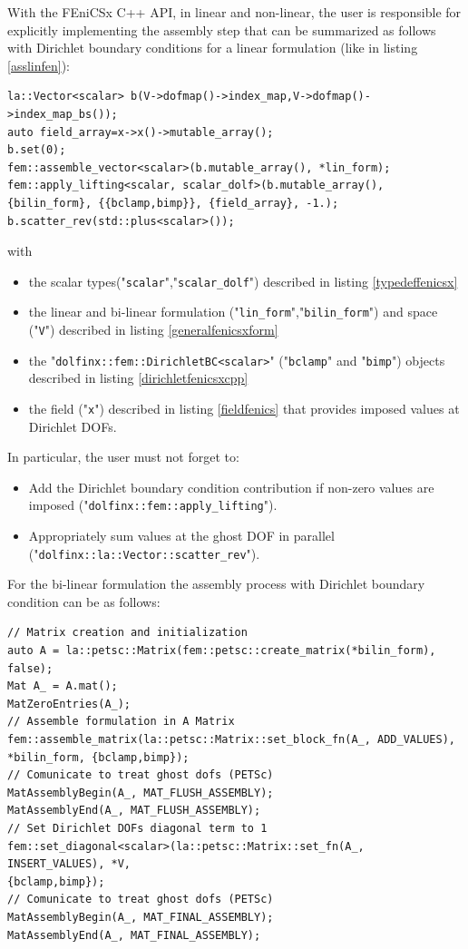 \documentclass[12pt]{article}
\newcommand{\mycode}[1]{\textsf{"}\lstinline`#1`\textsf{"}}
\begin{document}
With the FEniCSx C++ API, in linear and non-linear, the user is responsible for explicitly implementing the assembly step  that can be summarized as follows with Dirichlet boundary conditions for a linear formulation (like in listing \ref{asslinfen}): 
\begin{lstlisting}[numbers=none,basicstyle=\scriptsize,label=assfenicslinlin]
la::Vector<scalar> b(V->dofmap()->index_map,V->dofmap()->index_map_bs());
auto field_array=x->x()->mutable_array();
b.set(0);	
fem::assemble_vector<scalar>(b.mutable_array(), *lin_form);
fem::apply_lifting<scalar, scalar_dolf>(b.mutable_array(), {bilin_form}, {{bclamp,bimp}}, {field_array}, -1.);
b.scatter_rev(std::plus<scalar>()); 
\end{lstlisting}
with 
\begin{itemize}
	\item the scalar types(\mycode{scalar},\mycode{scalar_dolf})  described in listing \ref{typedeffenicsx}
	\item the linear and bi-linear formulation (\mycode{lin_form},\mycode{bilin_form}) and space (\mycode{V}) described in listing \ref{generalfenicsxform}
	\item the \mycode{dolfinx::fem::DirichletBC<scalar>} (\mycode{bclamp} and \mycode{bimp}) objects described in listing \ref{dirichletfenicsxcpp}
	\item the field (\mycode{x}) described in listing \ref{fieldfenics} that provides imposed values at Dirichlet DOFs.
\end{itemize}
In particular, the user must not forget to:
\begin{itemize}
	\item Add the Dirichlet boundary condition contribution if non-zero values are imposed (\mycode{dolfinx::fem::apply_lifting}). 
\item Appropriately sum values at the ghost DOF in parallel (\mycode{dolfinx::la::Vector::scatter_rev}).
\end{itemize}
For the bi-linear formulation the assembly process with Dirichlet boundary condition can be as follows: 
\begin{lstlisting}[numbers=none,basicstyle=\scriptsize,label=assfenicsbilinlin]
// Matrix creation and initialization
auto A = la::petsc::Matrix(fem::petsc::create_matrix(*bilin_form), false);
Mat A_ = A.mat();
MatZeroEntries(A_);
// Assemble formulation in A Matrix
fem::assemble_matrix(la::petsc::Matrix::set_block_fn(A_, ADD_VALUES),
*bilin_form, {bclamp,bimp});
// Comunicate to treat ghost dofs (PETSc)
MatAssemblyBegin(A_, MAT_FLUSH_ASSEMBLY);
MatAssemblyEnd(A_, MAT_FLUSH_ASSEMBLY);
// Set Dirichlet DOFs diagonal term to 1
fem::set_diagonal<scalar>(la::petsc::Matrix::set_fn(A_, INSERT_VALUES), *V,
{bclamp,bimp});
// Comunicate to treat ghost dofs (PETSc)
MatAssemblyBegin(A_, MAT_FINAL_ASSEMBLY);
MatAssemblyEnd(A_, MAT_FINAL_ASSEMBLY);
\end{lstlisting}
\end{document}
